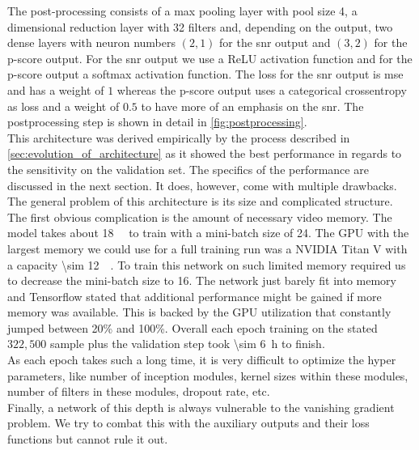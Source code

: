 The post-processing consists of a max pooling layer with pool size 4, a dimensional reduction layer with 32 filters and, depending on the output, two dense layers with neuron numbers $(2,1)$ for the \gls{snr} output and $(3,2)$ for the p-score output. For the \gls{snr} output we use a ReLU activation function and for the p-score output a softmax activation function. The loss for the \gls{snr} output is \gls{mse} and has a weight of $1$ whereas the p-score output uses a categorical crossentropy as loss and a weight of $0.5$ to have more of an emphasis on the \gls{snr}. The postprocessing step is shown in detail in \autoref{fig:postprocessing}.\medskip\\
This architecture was derived empirically by the process described in \autoref{sec:evolution_of_architecture} as it showed the best performance in regards to the sensitivity on the validation set. The specifics of the performance are discussed in the next section. It does, however, come with multiple drawbacks. The general problem of this architecture is its size and complicated structure. The first obvious complication is the amount of necessary video memory. The model takes about \SI{18}{\giga\byte} to train with a mini-batch size of 24. The GPU with the largest memory we could use for a full training run was a NVIDIA Titan V with a capacity \SI{\sim 12}{\giga\byte}. To train this network on such limited memory required us to decrease the mini-batch size to 16. The network just barely fit into memory and Tensorflow stated that additional performance might be gained if more memory was available. This is backed by the GPU utilization that constantly jumped between 20\% and 100\%. Overall each epoch training on the stated $322,500$ sample plus the validation step took \SI{\sim 6}{\hour} to finish.\\
As each epoch takes such a long time, it is very difficult to optimize the hyper parameters, like number of inception modules, kernel sizes within these modules, number of filters in these modules, dropout rate, etc.\\
Finally, a network of this depth is always vulnerable to the vanishing gradient problem. We try to combat this with the auxiliary outputs and their loss functions but cannot rule it out.


